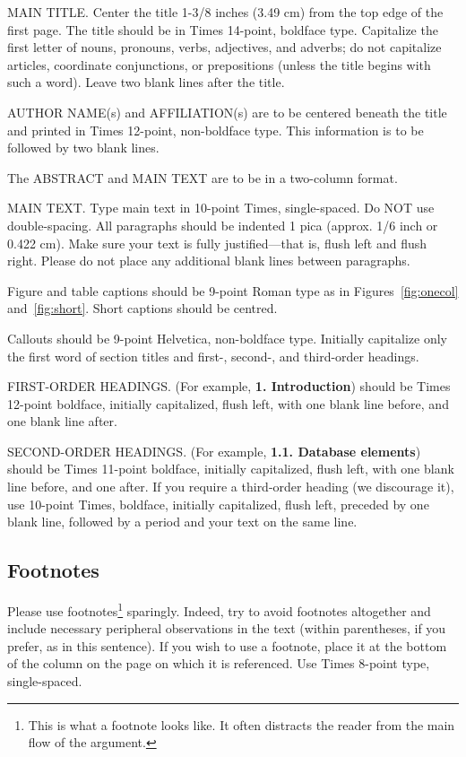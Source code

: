 \documentclass[10pt,twocolumn,letterpaper]{article}
\begin{document}
MAIN TITLE. Center the title 1-3/8 inches (3.49 cm) from the top edge of
the first page. The title should be in Times 14-point, boldface type.
Capitalize the first letter of nouns, pronouns, verbs, adjectives, and
adverbs; do not capitalize articles, coordinate conjunctions, or
prepositions (unless the title begins with such a word). Leave two blank
lines after the title.

AUTHOR NAME(s) and AFFILIATION(s) are to be centered beneath the title
and printed in Times 12-point, non-boldface type. This information is to
be followed by two blank lines.

The ABSTRACT and MAIN TEXT are to be in a two-column format.

MAIN TEXT. Type main text in 10-point Times, single-spaced. Do NOT use
double-spacing. All paragraphs should be indented 1 pica (approx. 1/6
inch or 0.422 cm). Make sure your text is fully justified---that is,
flush left and flush right. Please do not place any additional blank
lines between paragraphs.

Figure and table captions should be 9-point Roman type as in
Figures~\ref{fig:onecol} and~\ref{fig:short}.  Short captions should be centred.

\noindent Callouts should be 9-point Helvetica, non-boldface type.
Initially capitalize only the first word of section titles and first-,
second-, and third-order headings.

FIRST-ORDER HEADINGS. (For example, {\large \bf 1. Introduction})
should be Times 12-point boldface, initially capitalized, flush left,
with one blank line before, and one blank line after.

SECOND-ORDER HEADINGS. (For example, { \bf 1.1. Database elements})
should be Times 11-point boldface, initially capitalized, flush left,
with one blank line before, and one after. If you require a third-order
heading (we discourage it), use 10-point Times, boldface, initially
capitalized, flush left, preceded by one blank line, followed by a period
and your text on the same line.

\subsection{Footnotes}

Please use footnotes\footnote {This is what a footnote looks like.  It
often distracts the reader from the main flow of the argument.} sparingly.
Indeed, try to avoid footnotes altogether and include necessary peripheral
observations in
the text (within parentheses, if you prefer, as in this sentence).  If you
wish to use a footnote, place it at the bottom of the column on the page on
which it is referenced. Use Times 8-point type, single-spaced.
\end{document}
